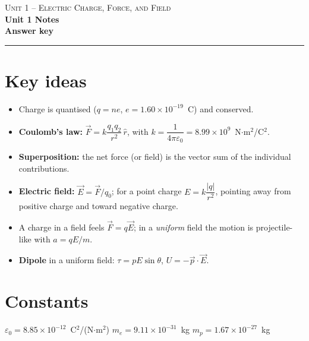 \documentclass[11pt,letterpaper]{article}
\begin{document}
{\small\textsc{Unit 1 -- Electric Charge, Force, and Field}}\\[2pt]{\Large\bfseries Unit 1 Notes}\\[8pt]\textbf{Answer key}\\[4pt]\hrule\vspace{10pt}{\small\itshape Placeholder worksheet for the site prototype. Free for classroom use.}\vspace{6pt}
\section*{Key ideas}
\begin{itemize}[itemsep=6pt]
  \item Charge is quantised ($q = ne$, $e = 1.60\times10^{-19}$~C) and conserved.
  \item \textbf{Coulomb's law:} $\vec{F} = k\dfrac{q_1 q_2}{r^2}\,\hat{r}$, with $k = \dfrac{1}{4\pi\varepsilon_0} = 8.99\times10^{9}$~N$\cdot$m$^2$/C$^2$.
  \item \textbf{Superposition:} the net force (or field) is the vector sum of the individual contributions.
  \item \textbf{Electric field:} $\vec{E} = \vec{F}/q_0$; for a point charge $E = k\dfrac{|q|}{r^2}$, pointing away from positive charge and toward negative charge.
  \item A charge in a field feels $\vec{F} = q\vec{E}$; in a \emph{uniform} field the motion is projectile-like with $a = qE/m$.
  \item \textbf{Dipole} in a uniform field: $\tau = pE\sin\theta$, $U = -\vec{p}\cdot\vec{E}$.
\end{itemize}
\section*{Constants}
$\varepsilon_0 = 8.85\times10^{-12}$~C$^2$/(N$\cdot$m$^2$) \qquad $m_e = 9.11\times10^{-31}$~kg \qquad $m_p = 1.67\times10^{-27}$~kg
\end{document}
